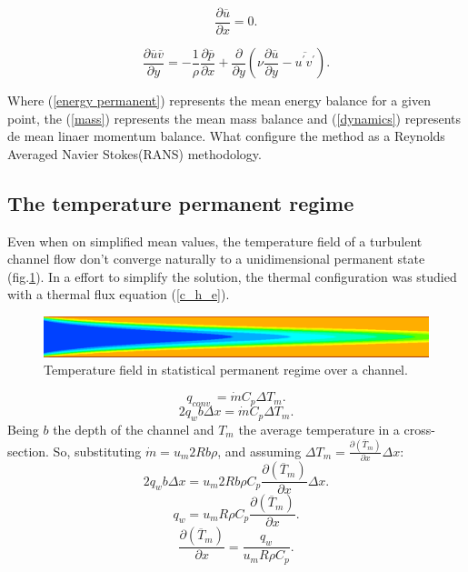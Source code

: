 \documentclass[10pt]{article} %
\begin{document}
\begin{equation}\label{mass}
\frac{\partial \overline{u}}{\partial x} = 0.
\end{equation}

\begin{equation}\label{dynamics}
\frac{\partial \overline{u}\overline{v}}{\partial y} = 
- \frac{1}{\rho} \frac{\partial \overline{p}}{\partial x} + \frac{\partial}{\partial y}\left(\nu \frac{\partial \overline{u}}{\partial y} - \overline{u^\prime v^\prime}\right).
\end{equation}

Where (\ref{energy permanent}) represents the mean energy balance for a given point, the (\ref{mass}) represents the mean mass balance and (\ref{dynamics}) represents de mean linaer momentum balance. What configure the method as a Reynolds Averaged Navier Stokes(RANS) methodology.

\subsection{The temperature permanent regime}

Even when on simplified mean values, the temperature field of a turbulent channel flow don't converge naturally to a unidimensional permanent state (fig.\ref{figure.2}). In a effort to simplify the solution, the thermal configuration was studied with a thermal flux equation (\ref{c_h_e}).
\begin{figure}[h!]
	\centering
	\includegraphics[angle=0, scale=0.40]{temperatura}
	\caption{Temperature field in statistical permanent regime over a channel.}
	\label{figure.2}
\end{figure}
\begin{equation}\label{c_h_e}
q_{conv.} = \dot{m} C_p \Delta T_m.
\end{equation}
\begin{equation}
2q_w b \Delta x = \dot{m} C_p \Delta T_m.
\end{equation}
Being $b$ the depth of the channel and $T_m$ the average temperature in a cross-section. So, substituting $ \dot{m} = u_m 2R b \rho $, and assuming $ \Delta T_m = \frac{\partial{\left(\overline{T}_m\right)}}{\partial{x}} \Delta x $:
\begin{equation}
2q_w b \Delta x = u_m 2R b \rho  C_p \frac{\partial{\left(\overline{T}_m\right)}}{\partial{x}} \Delta x.
\end{equation}     
\begin{equation}
q_w = u_m R \rho  C_p \frac{\partial{\left(\overline{T}_m\right)}}{\partial{x}} .
\end{equation} 
\begin{equation}\label{c_h_ee}
\frac{\partial{\left(\overline{T}_m\right)}}{\partial{x}} = \frac{q_w}{u_m  R \rho  C_p } .
\end{equation} 
\end{document}
